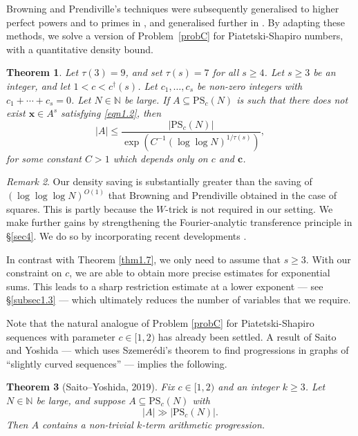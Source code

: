 \documentclass[12pt, reqno]{amsart}
\newtheorem{thm}{Theorem}[section]
\theoremstyle{definition}
\theoremstyle{remark}
\newtheorem{remark}[thm]{Remark}
\numberwithin{equation}{section}
\theoremstyle{definition}
\def \bN {\mathbb N}
\def \bc {\mathbf c}
\def \bx {\mathbf x}
\def \PS {\mathrm{PS}}
\begin{document}
Browning and Prendiville's techniques were subsequently generalised to higher perfect powers and to primes in \cite{Cho2018}, and generalised further in \cite{Cha2022, CC1, CC2}.
By adapting these methods, we solve a version of Problem~\ref{probC} for Piatetski-Shapiro numbers, with a quantitative density bound.

\begin{thm} 
\label{thm1.8}
Let $\tau(3)=9$, and set $\tau(s)=7$ for all $s\geqslant 4$.
Let $s \ge 3$ be an integer, and let
$1 < c < c^\dag(s)$.
Let $c_1, \ldots, c_s$ be non-zero integers with
$c_1 + \cdots + c_s = 0$.
Let $N \in \bN$ be large. If $A \subseteq \PS_c(N)$ is such that there does not exist $\bx\in A^s$ satisfying \eqref{eqn1.2}, then
\begin{equation*}
|A| \leqslant \frac{|\PS_c(N)|}{\exp\left(C^{-1}(\log\log N)^{1/\tau(s)}\right)},
\end{equation*}
for some constant $C>1$ which depends only on $c$ and $\bc$.
\end{thm}

\begin{remark} Our density saving is substantially greater than the saving of $(\log \log \log N)^{O(1)}$ that Browning and Prendiville obtained in the case of squares. This is partly because the $W$-trick is not required in our setting. We make further gains by strengthening the Fourier-analytic transference principle \cite[Proposition 2.8]{BP2017} in \S \ref{sec4}. We do so by incorporating recent developments \cite{FHHK2024, Kos}.

In contrast with Theorem \ref{thm1.7}, we only need to assume that $s \ge 3$. With our constraint on $c$, we are able to obtain more precise estimates for exponential sums. This leads to a sharp restriction estimate at a lower exponent --- see \S \ref{subsec1.3} --- which ultimately reduces the number of variables that we require.
\end{remark}

Note that the natural analogue of Problem \ref{probC} for Piatetski-Shapiro sequences with parameter $c \in [1,2)$ has already been settled. A result of Saito and Yoshida \cite[Corollary 5]{SY2019} --- which uses Szemer\'edi's theorem \cite{Sze1975} to find progressions in graphs of ``slightly curved sequences'' --- implies the following.

\begin{thm} [Saito--Yoshida, 2019]
Fix $c \in [1,2)$ and an integer $k \ge 3$. Let $N \in \bN$ be large, and suppose $A \subseteq \PS_c(N)$ with 
\[
|A| \gg |\PS_c(N)|.
\]
Then $A$ contains a non-trivial $k$-term arithmetic progression.
\end{thm}
\end{document}
